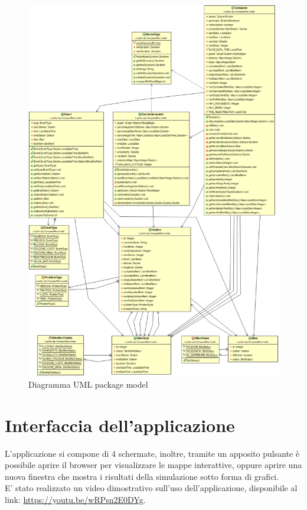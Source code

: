 \documentclass[a4paper, 12pt]{article}
\begin{document}
	\begin{figure}[H]
	\caption{Diagramma UML package model}
	\label{umlmodel}
	\hfill \includegraphics[height=0.95\textheight]{resources/images/UML/UMLmodel.png} \hspace*{\fill}
	\end{figure}	

\newpage


\section{Interfaccia dell'applicazione}

L'applicazione si compone di 4 schermate, inoltre, tramite un apposito pulsante è possibile aprire il browser per visualizzare le mappe interattive, oppure aprire una nuova finestra che mostra i risultati della simulazione sotto forma di grafici.\\
E' stato realizzato un video dimostrativo sull'uso dell'applicazione, disponibile al link: \url{https://youtu.be/wRPsn2E0DYg}.
\end{document}
